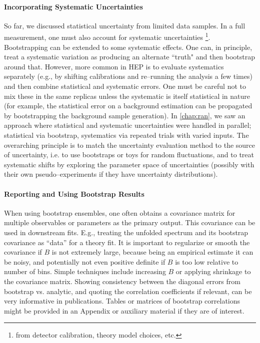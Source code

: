         \paragraph{Incorporating Systematic Uncertainties}
            So far, we discussed statistical uncertainty from limited data samples.
            In a full measurement, one must also account for systematic uncertainties \footnote{from detector calibration, theory model choices, etc.}.
            Bootstrapping can be extended to some systematic effects.
            One can, in principle, treat a systematic variation as producing an alternate ``truth" and then bootstrap around that.
            However, more common in HEP is to evaluate systematics separately (e.g., by shifting calibrations and re--running the analysis a few times) and then combine statistical and systematic errors.
            One must be careful not to mix these in the same replicas unless the systematic is itself statistical in nature (for example, the statistical error on a background estimation can be propagated by bootstrapping the background sample generation).
            In \cref{chap:ran}, we saw an approach where statistical and systematic uncertainties were handled in parallel;
            statistical via bootstrap, systematics via repeated trials with varied inputs.
            The overarching principle is to match the uncertainty evaluation method to the source of uncertainty, i.e. to use bootstraps or toys for random fluctuations, and to treat systematic shifts by exploring the parameter space of uncertainties (possibly with their own pseudo--experiments if they have uncertainty distributions).
        \paragraph{Reporting and Using Bootstrap Results}
            When using bootstrap ensembles, one often obtains a covariance matrix for multiple observables or parameters as the primary output.
            This covariance can be used in downstream fits.
            E.g., treating the unfolded spectrum and its bootstrap covariance as “data” for a theory fit.
            It is important to regularize or smooth the covariance if $B$ is not extremely large, because being an empirical estimate it can be noisy, and potentially not even positive definite if $B$ is too low relative to number of bins.
            Simple techniques include increasing $B$ or applying shrinkage to the covariance matrix.
            Showing consistency between the diagonal errors from bootstrap vs. analytic, and quoting the correlation coefficients if relevant, can be very informative  in publications.
            Tables or matrices of bootstrap correlations might be provided in an Appendix or auxiliary material if they are of interest.
